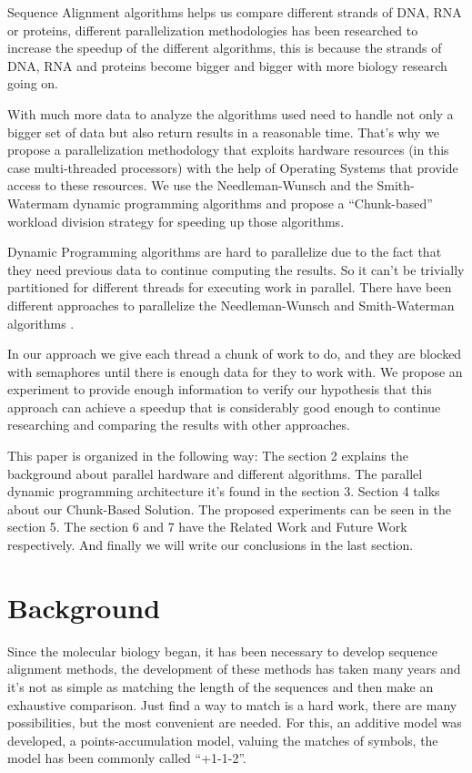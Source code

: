 \documentclass[journal]{IEEEtran}
\begin{document}
Sequence Alignment algorithms helps us compare different strands of DNA, RNA or proteins, different parallelization methodologies has been researched to increase the speedup of the different algorithms, this is because the strands of DNA, RNA and proteins become bigger and bigger with more biology research going on.

With much more data to analyze the algorithms used need to handle not only a bigger set of data but also return results in a reasonable time. That's why we propose a parallelization methodology that exploits hardware resources (in this case multi-threaded processors) with the help of Operating Systems that provide access to these resources. We use the Needleman-Wunsch and the Smith-Watermam dynamic programming algorithms and propose a ``Chunk-based'' workload division strategy for speeding up those algorithms.


Dynamic Programming algorithms are hard to parallelize due to the fact that they need previous data to continue computing the results. So it can't be trivially partitioned for different threads for executing work in parallel. There have been different approaches to parallelize the Needleman-Wunsch and Smith-Waterman algorithms \cite{liu2013cudasw++, rognes2011faster, manavski2008cuda, tahirParallelNW}.

In our approach we give each thread a chunk of work to do, and they are blocked with semaphores until there is enough data for they to work with. We propose an experiment to provide enough information to verify our hypothesis that this approach can achieve a speedup that is considerably good enough to continue researching and comparing the results with other approaches. 

This paper is organized in the following way: The section 2 explains the background about parallel hardware and different algorithms. The parallel dynamic programming architecture it's found in the section 3. Section 4 talks about our Chunk-Based Solution. The proposed experiments can be seen in the section 5. The section 6 and 7 have the Related Work and Future Work respectively. And finally we will write our conclusions in the last section.

\section{Background}

Since the molecular biology began, it has been necessary to develop sequence alignment methods, the development of these methods has taken many years and it's not as simple as matching the length of the sequences and then make an exhaustive comparison. Just find a way to match is a hard work, there are many possibilities, but the most convenient are needed. For this, an additive model was developed, a points-accumulation model, valuing the matches of symbols, the model has been commonly called ``+1-1-2''.
\end{document}
